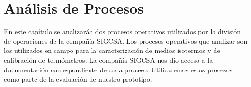 \chapter{Análisis de Procesos}

\par 
En este capítulo se analizarán dos procesos operativos utilizados por la división de operaciones de la compañía SIGCSA. Los procesos operativos que analizar son los utilizados en campo para la caracterización de medios isotermos y de calibración de termómetros. La compañía SIGCSA nos dio acceso a la documentación correspondiente de cada proceso. Utilizaremos estos procesos como parte de la evaluación de nuestro prototipo.




	
